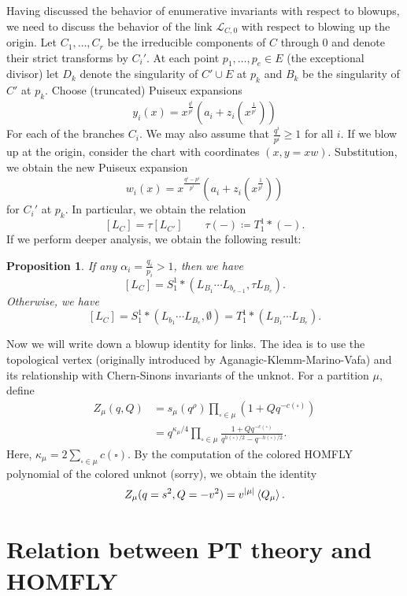 \documentclass[leqno, openany]{memoir}
\newtheorem{prop}[thm]{Proposition}
\theoremstyle{definition}
\theoremstyle{remark}
\theoremstyle{plain}
\theoremstyle{definition}
\theoremstyle{remark}
\newcommand{\mc}[1]{\mathcal{#1}}
\newcommand{\1}{\mathbf{1}}
\newcommand{\2}{\mathbf{2}}
\newcommand{\3}{\mathbf{3}}
\begin{document}
Having discussed the behavior of enumerative invariants with respect to blowups, we need to discuss the behavior of the link $\mc{L}_{C,0}$ with respect to blowing up the origin. Let $C_1, \ldots, C_r$ be the irreducible components of $C$ through $0$ and denote their strict transforms by $C_i'$. At each point $p_1, \ldots, p_e \in E$ (the exceptional divisor) let $D_k$ denote the singularity of $C' \cup E$ at $p_k$ and $B_k$ be the singularity of $C'$ at $p_k$. Choose (truncated) Puiseux expansions
\[ y_i(x) = x^{\frac{q^i}{p^i}} (a_i + z_i (x^{\frac{1}{p^i}})) \]
For each of the branches $C_i$. We may also assume that $\frac{q^i}{p^i} \geq 1$ for all $i$. If we blow up at the origin, consider the chart with coordinates $(x, y = xw)$. Substitution, we obtain the new Puiseux expansion
\[ w_i(x) = x^{\frac{q^i - p^i}{p^i}} (a_i + z_i(x^{\frac{1}{p^i}})) \]
for $C_i'$ at $p_k$. In particular, we obtain the relation
\[ [L_C] = \tau [L_{C'}] \qquad \tau(-) \coloneqq T_1^1 * (-). \]
If we perform deeper analysis, we obtain the following result:

\begin{prop}
    If any $\alpha_i = \frac{q_i}{p_i} > 1$, then we have
    \[ [L_C] = S_1^1 * (L_{B_1} \cdots L_{b_{e-1}}, \tau L_{B_e}). \]
    Otherwise, we have
    \[ [L_C] = S_1^1 * (L_{b_1} \cdots L_{B_e}, \emptyset) = T_1^1 * (L_{B_1} \cdots L_{B_e}). \]
\end{prop}

Now we will write down a blowup identity for links. The idea is to use the topological vertex (originally introduced by Aganagic-Klemm-Marino-Vafa) and its relationship with Chern-Sinons invariants of the unknot. For a partition $\mu$, define
\begin{align*}
    Z_{\mu}(q, Q) &= s_{\mu}(q^{\rho}) \prod_{\square \in \mu} (1 + Q q^{-c(\square)}) \\
    &= q^{\kappa_{\mu}/4} \prod_{\square \in \mu} \frac{1 + Q q^{-c(\square)}}{q^{h(\square)/2} - q^{-h(\square)/2}}.
\end{align*}
Here, $\kappa_{\mu} = 2 \sum_{\square \in \mu} c(\square)$. By the computation of the colored HOMFLY polynomial of the colored unknot (sorry), we obtain the identity
\begin{align*}
    Z_{\mu}(q=s^2, Q=-v^2) = v^{\abs{\mu}} \ev{Q_{\mu}}.
\end{align*}

\section{Relation between PT theory and HOMFLY}%
\label{sec:relation_between_pt_theory_and_homfly}
\end{document}
